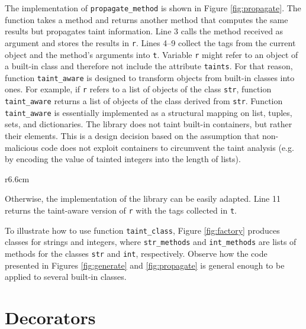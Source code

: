 The implementation of \texttt{propagate\_method} is shown in Figure
\ref{fig:propagate}. The function takes a method and returns another
method that computes the same results but propagates taint information. Line 3
calls the method received as argument and stores the results in 
\texttt{r}. 
Lines 4--9 collect the tags from the current object and 
the method's arguments into \texttt{t}. 
Variable \texttt{r} 
might refer to an object of a built-in class and
therefore not include the attribute \texttt{taints}. For that reason, 
function \texttt{taint\_aware} is designed to 
transform objects from built-in classes  
into \nametklass ones. 
For example, if \texttt{r} refers
to a list of objects of the class \texttt{str}, function \texttt{taint\_aware} returns  
a list of objects of the \nametklass class 
derived from \texttt{str}. 
Function \texttt{taint\_aware} 
is essentially implemented as a structural mapping on list, tuples,
sets, and dictionaries. 
The library does not
taint built-in containers, but rather their elements. This is a design decision 
based on the assumption that non-malicious code does not exploit
containers to circumvent the taint analysis (e.g. by 
encoding the value of tainted integers into 
the length of lists).
\begin{wrapfigure}{r}{6.6cm}
\vspace{-20pt}
{\small{

\caption{\label{fig:factory} \nameTklass classes for strings and
  integers}
}}
\vspace{-20pt}
\end{wrapfigure}
Otherwise, the implementation of the library can be easily adapted.
Line 11 returns the taint-aware version of \texttt{r} 
with the tags collected in \texttt{t}. 



  
To illustrate how to use  function \texttt{taint\_class}, Figure \ref{fig:factory} 
produces \nametklass classes for strings and integers, where 
\texttt{str\_methods} and \texttt{int\_methods} are lists 
of methods for the classes \texttt{str} and
\texttt{int}, respectively. Observe how the code presented in Figures
\ref{fig:generate} and \ref{fig:propagate} is general enough to be
applied to several built-in classes.
  

\section{Decorators}

